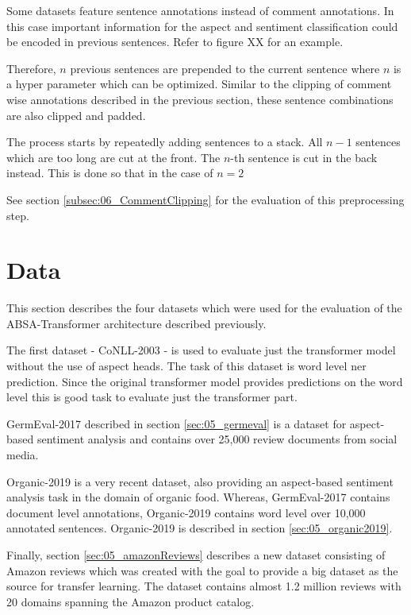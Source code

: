Some datasets feature sentence annotations instead of comment annotations. In this case important information for the aspect and sentiment classification could be encoded in previous sentences. Refer to figure XX for an example.
\medskip

Therefore, $n$ previous sentences are prepended to the current sentence where $n$ is a hyper parameter which can be optimized. Similar to the clipping of comment wise annotations described in the previous section, these sentence combinations are also clipped and padded. 
\medskip

The process starts by repeatedly adding sentences to a stack. All $n-1$ sentences which are too long are cut at the front. The $n$-th sentence is cut in the back instead. This is done so that in the case of $n=2$ 


See section \ref{subsec:06_CommentClipping} for the evaluation of this preprocessing step.

\section{Data}
\label{sec:05_Data}

This section describes the four datasets which were used for the evaluation of the ABSA-Transformer architecture described previously.

The first dataset - CoNLL-2003 - is used to evaluate just the transformer model without the use of aspect heads. The task of this dataset is word level \gls{ner} prediction. Since the original transformer model provides predictions on the word level this is good task to evaluate just the transformer part.
\medskip

GermEval-2017 described in section \ref{sec:05_germeval} is a dataset for aspect-based sentiment analysis and contains over 25,000 review documents from social media.
\medskip

Organic-2019 is a very recent dataset, also providing an aspect-based sentiment analysis task in the domain of organic food. Whereas, GermEval-2017 contains document level annotations, Organic-2019 contains word level over 10,000 annotated sentences. Organic-2019 is described in section \ref{sec:05_organic2019}.
\medskip

Finally, section \ref{sec:05_amazonReviews} describes a new dataset consisting of Amazon reviews which was created with the goal to provide a big dataset as the source for transfer learning. The dataset contains almost 1.2 million reviews with 20 domains spanning the Amazon product catalog.

